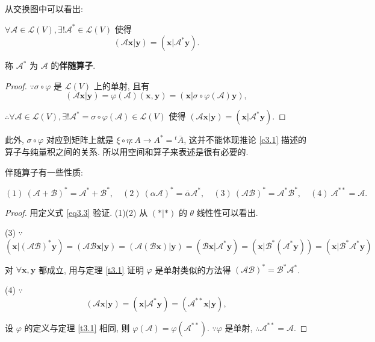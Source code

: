 \documentclass{ctexart}
\begin{document}
从交换图中可以看出:
\begin{corollary}\label{c3.1}
    $\forall\mathcal{A}\in\mathcal{L}(V),\exists!\mathcal{A}^*\in\mathcal{L}(V)$ 使得
    \begin{equation}\label{eq3.3}
        (\mathcal{A}\boldsymbol{x}|\boldsymbol{y})=(\boldsymbol{x}|\mathcal{A}^*\boldsymbol{y}).
    \end{equation}

    称 $\mathcal{A}^*$ 为 $\mathcal{A}$ 的\textbf{伴随算子}.
\end{corollary}
\begin{proof}
    $\because\sigma\circ\varphi$ 是 $\mathcal{L}(V)$ 上的单射, 且有
    \[(\mathcal{A}\boldsymbol{x}|\boldsymbol{y})=\varphi(\mathcal{A})(\boldsymbol{x},\boldsymbol{y})=(\boldsymbol{x}|\sigma\circ\varphi(\mathcal{A})\boldsymbol{y}),\]

    $\therefore\forall\mathcal{A}\in\mathcal{L}(V),\exists!\mathcal{A}^*=\sigma\circ\varphi(\mathcal{A})\in\mathcal{L}(V)$ 使得 $(\mathcal{A}\boldsymbol{x}|\boldsymbol{y})=(\boldsymbol{x}|\mathcal{A}^*\boldsymbol{y})$.
\end{proof}
此外, $\sigma\circ\varphi$ 对应到矩阵上就是 $\xi\circ\eta:A\to A^*={}^t\overline{A}$, 这并不能体现推论 \ref{c3.1} 描述的算子与纯量积之间的关系. 所以用空间和算子来表述是很有必要的.

伴随算子有一些性质:
\begin{property}
    \[(1)\ (\mathcal{A}+\mathcal{B})^*=\mathcal{A}^*+\mathcal{B}^*,\quad(2)\ (\alpha\mathcal{A})^*=\overline{\alpha}\mathcal{A}^*,\quad(3)\ (\mathcal{A}\mathcal{B})^*=\mathcal{A}^*\mathcal{B}^*,\quad(4)\ \mathcal{A}^{**}=\mathcal{A}.\]
\end{property}
\begin{proof}
    用定义式 \ref{eq3.3} 验证. (1)(2) 从 $(*|*)$ 的 $\theta$ 线性性可以看出.

    (3) $\because$
    \[(\boldsymbol{x}|(\mathcal{A}\mathcal{B})^*\boldsymbol{y})=(\mathcal{A}\mathcal{B}\boldsymbol{x}|\boldsymbol{y})=(\mathcal{A}(\mathcal{B}\boldsymbol{x})|\boldsymbol{y})=(\mathcal{B}\boldsymbol{x}|\mathcal{A}^*\boldsymbol{y})=(\boldsymbol{x}|\mathcal{B}^*(\mathcal{A}^*\boldsymbol{y}))=(\boldsymbol{x}|\mathcal{B}^*\mathcal{A}^*\boldsymbol{y})\]

    对 $\forall\boldsymbol{x},\boldsymbol{y}$ 都成立, 用与定理 \ref{t3.1} 证明 $\varphi$ 是单射类似的方法得 $(\mathcal{A}\mathcal{B})^*=\mathcal{B}^*\mathcal{A}^*$.

    (4) $\because$
    \[(\mathcal{A}\boldsymbol{x}|\boldsymbol{y})=(\boldsymbol{x}|\mathcal{A}^*\boldsymbol{y})=(\mathcal{A}^{**}\boldsymbol{x}|\boldsymbol{y}),\]

    设 $\varphi$ 的定义与定理 \ref{t3.1} 相同, 则 $\varphi(\mathcal{A})=\varphi(\mathcal{A}^{**})$. $\because\varphi$ 是单射, $\therefore\mathcal{A}^{**}=\mathcal{A}$.
\end{proof}
\end{document}
